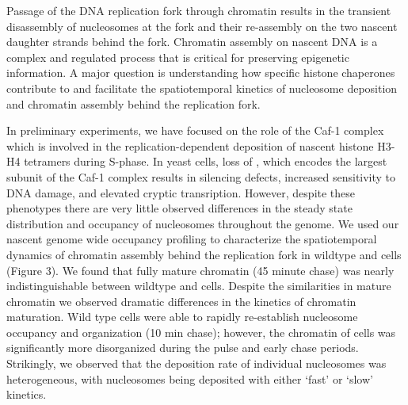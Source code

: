 Passage of the DNA replication fork through chromatin results in the transient disassembly of nucleosomes at the fork and their re-assembly on the two nascent daughter strands behind the fork.  Chromatin assembly on nascent DNA is a complex and regulated process that is critical for preserving epigenetic information.  A major question is understanding how specific histone chaperones contribute to and facilitate the spatiotemporal kinetics of nucleosome deposition and chromatin assembly behind the replication fork. 






 In preliminary experiments, we have focused on the role of the Caf-1 complex which is involved in the replication-dependent deposition of nascent histone H3-H4 tetramers during S-phase\citep{}.  In yeast cells, loss of \CAC, which encodes the largest subunit of the Caf-1 complex results in silencing defects\cite{}, increased sensitivity to DNA damage\cite{}, and elevated cryptic transription\cite{}. However, despite these phenotypes there are very little observed differences in the steady state distribution and occupancy of nucleosomes throughout the genome.  We used our nascent genome wide occupancy profiling\citep{Gutierrez2019-kw} to characterize the spatiotemporal dynamics of chromatin assembly behind the replication fork in wildtype and \cac cells (Figure 3).  We found that fully mature chromatin (45 minute chase) was nearly indistinguishable between wildtype and \cac cells.  Despite the similarities in mature chromatin we observed dramatic differences in the kinetics of chromatin maturation.  Wild type cells were able to rapidly re-establish nucleosome occupancy and organization (10 min chase); however, the chromatin of \cac cells was significantly more disorganized during the pulse and early chase periods.  Strikingly, we observed that the deposition rate of individual nucleosomes was heterogeneous, with  nucleosomes being deposited with either `fast' or `slow' kinetics.  

